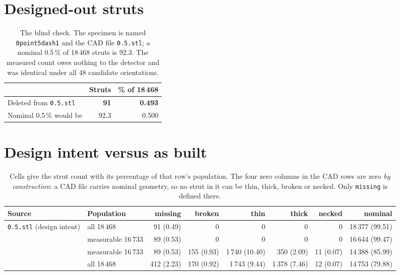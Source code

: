 \documentclass[11pt]{article}
\begin{document}
\section{Designed-out struts}

\begin{table}[h]
\centering
\caption{The blind check. The specimen is named \texttt{0point5dash1} and the CAD file
\texttt{0.5.stl}; a nominal 0.5\,\% of 18\,468 struts is 92.3. The measured count owes
nothing to the detector and was identical under all 48 candidate orientations.}
\label{tab:designedout}
\small
\begin{tabular}{lrr}
\toprule
 & Struts & \% of 18\,468 \\
\midrule
Deleted from \texttt{0.5.stl} & \textbf{91} & \textbf{0.493} \\
Nominal 0.5\,\% would be      & 92.3 & 0.500 \\
\bottomrule
\end{tabular}
\end{table}

\section{Design intent versus as built}

\begin{table}[h]
\centering
\caption{Cells give the strut count with its percentage of that row's population. The
four zero columns in the CAD rows are zero \emph{by construction}: a CAD file carries
nominal geometry, so no strut in it can be thin, thick, broken or necked. Only
\texttt{missing} is defined there.}
\label{tab:main}
\small
\setlength{\tabcolsep}{4pt}
\begin{tabular}{llrrrrrr}
\toprule
Source & Population & missing & broken & thin & thick & necked & nominal \\
\midrule
\multirow{2}{*}{\texttt{0.5.stl} (design intent)}
 & all 18\,468        & 91 (0.49)  & 0 & 0 & 0 & 0 & 18\,377 (99.51) \\
 & measurable 16\,733 & 89 (0.53)  & 0 & 0 & 0 & 0 & 16\,644 (99.47) \\
\addlinespace
\multirow{2}{*}{\texttt{CT} (as built)}
 & measurable 16\,733 & 89 (0.53)  & 155 (0.93) & 1\,740 (10.40) & 350 (2.09)   & 11 (0.07) & 14\,388 (85.99) \\
 & all 18\,468        & 412 (2.23) & 170 (0.92) & 1\,743 (9.44)  & 1\,378 (7.46) & 12 (0.07) & 14\,753 (79.88) \\
\bottomrule
\end{tabular}
\end{table}
\end{document}
